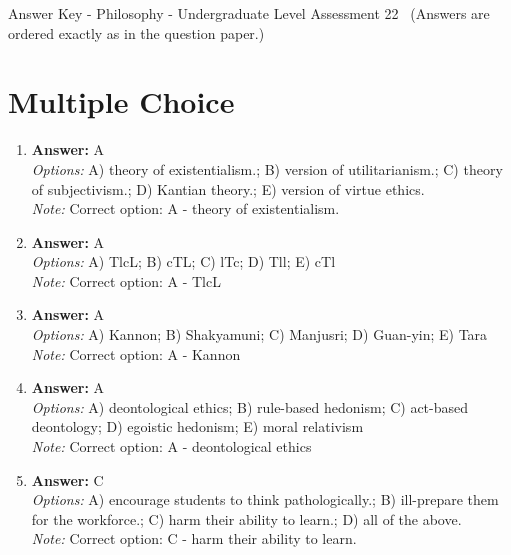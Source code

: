 \documentclass[12pt]{article}
\begin{document}
\begin{center}
Answer Key - Philosophy - Undergraduate Level Assessment 22 \
\small (Answers are ordered exactly as in the question paper.)
\end{center}

\section*{Multiple Choice}
\begin{enumerate}[label=\arabic*.]
\item \textbf{Answer:} A
\\ \textit{Options:} A) theory of existentialism.; B) version of utilitarianism.; C) theory of subjectivism.; D) Kantian theory.; E) version of virtue ethics.
\\ \textit{Note:} Correct option: A - theory of existentialism.
\item \textbf{Answer:} A
\\ \textit{Options:} A) TlcL; B) cTL; C) lTc; D) Tll; E) cTl
\\ \textit{Note:} Correct option: A - TlcL
\item \textbf{Answer:} A
\\ \textit{Options:} A) Kannon; B) Shakyamuni; C) Manjusri; D) Guan-yin; E) Tara
\\ \textit{Note:} Correct option: A - Kannon
\item \textbf{Answer:} A
\\ \textit{Options:} A) deontological ethics; B) rule-based hedonism; C) act-based deontology; D) egoistic hedonism; E) moral relativism
\\ \textit{Note:} Correct option: A - deontological ethics
\item \textbf{Answer:} C
\\ \textit{Options:} A) encourage students to think pathologically.; B) ill-prepare them for the workforce.; C) harm their ability to learn.; D) all of the above.
\\ \textit{Note:} Correct option: C - harm their ability to learn.
\end{enumerate}
\end{document}

